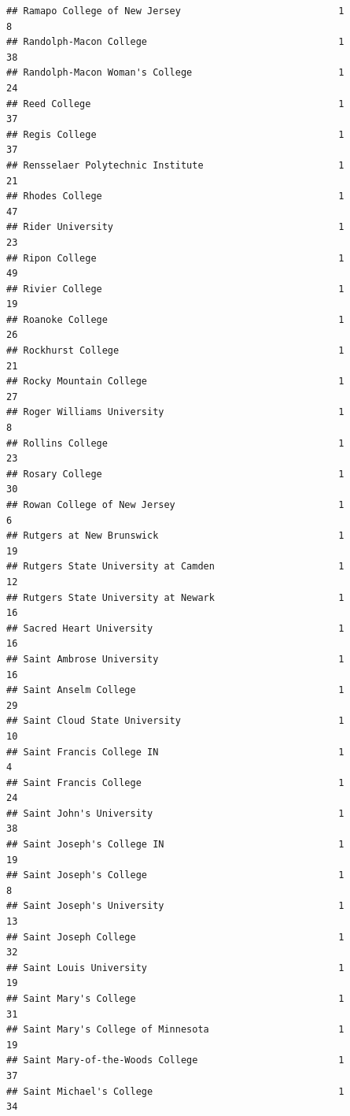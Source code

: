 \documentclass[
]{article}
\begin{document}
\begin{verbatim}
## Ramapo College of New Jersey                            1           8
## Randolph-Macon College                                  1          38
## Randolph-Macon Woman's College                          1          24
## Reed College                                            1          37
## Regis College                                           1          37
## Rensselaer Polytechnic Institute                        1          21
## Rhodes College                                          1          47
## Rider University                                        1          23
## Ripon College                                           1          49
## Rivier College                                          1          19
## Roanoke College                                         1          26
## Rockhurst College                                       1          21
## Rocky Mountain College                                  1          27
## Roger Williams University                               1           8
## Rollins College                                         1          23
## Rosary College                                          1          30
## Rowan College of New Jersey                             1           6
## Rutgers at New Brunswick                                1          19
## Rutgers State University at Camden                      1          12
## Rutgers State University at Newark                      1          16
## Sacred Heart University                                 1          16
## Saint Ambrose University                                1          16
## Saint Anselm College                                    1          29
## Saint Cloud State University                            1          10
## Saint Francis College IN                                1           4
## Saint Francis College                                   1          24
## Saint John's University                                 1          38
## Saint Joseph's College IN                               1          19
## Saint Joseph's College                                  1           8
## Saint Joseph's University                               1          13
## Saint Joseph College                                    1          32
## Saint Louis University                                  1          19
## Saint Mary's College                                    1          31
## Saint Mary's College of Minnesota                       1          19
## Saint Mary-of-the-Woods College                         1          37
## Saint Michael's College                                 1          34

\end{verbatim}
\end{document}
